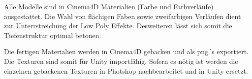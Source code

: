 
Alle Modelle sind in Cinema4D Materialien (Farbe und Farbverläufe) ausgestattet. Die Wahl von flächigen Faben sowie zweifarbigen Verläufen dient zur Unterrstreichung der Low Poly Effekte. Desweiteren lässt sich somit die Tiefenstruktur optimal betonen.

Die fertigen Materialien werden in Cinema4D gebacken und als png´s exportiert. Die Texturen sind somit für Unity importfähig. Sofern es nötig ist werden die einzelnen gebackenen Texturen in Photshop nachbearbeitet und in Unity ersetzt.